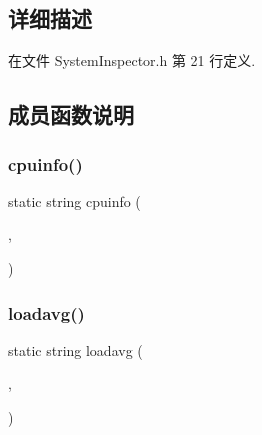 \subsection{详细描述}


在文件 System\+Inspector.\+h 第 21 行定义.



\subsection{成员函数说明}
\mbox{\label{classmuduo_1_1net_1_1SystemInspector_ad1f777bba9ee66741dc5336f969125f9}} 
\subsubsection{\texorpdfstring{cpuinfo()}{cpuinfo()}}
{\footnotesize\ttfamily static string cpuinfo (\begin{DoxyParamCaption}\item[{\hyperlink{classmuduo_1_1net_1_1HttpRequest_a2a3c0067e44c5ef3210a256d06c16b0f}{Http\+Request\+::\+Method}}]{,  }\item[{const \hyperlink{classmuduo_1_1net_1_1Inspector_aa22799cd3b4f56688d431d68c2d014a0}{Inspector\+::\+Arg\+List} \&}]{ }\end{DoxyParamCaption})\hspace{0.3cm}{\ttfamily [static]}}

\mbox{\label{classmuduo_1_1net_1_1SystemInspector_a006590ef4e572bac984bf8b400341de3}} 
\subsubsection{\texorpdfstring{loadavg()}{loadavg()}}
{\footnotesize\ttfamily static string loadavg (\begin{DoxyParamCaption}\item[{\hyperlink{classmuduo_1_1net_1_1HttpRequest_a2a3c0067e44c5ef3210a256d06c16b0f}{Http\+Request\+::\+Method}}]{,  }\item[{const \hyperlink{classmuduo_1_1net_1_1Inspector_aa22799cd3b4f56688d431d68c2d014a0}{Inspector\+::\+Arg\+List} \&}]{ }\end{DoxyParamCaption})\hspace{0.3cm}{\ttfamily [static]}}

